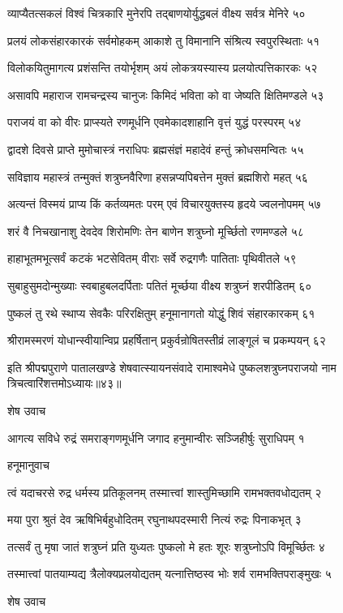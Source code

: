 व्याप्यैतत्सकलं विश्वं चित्रकारि मुनेरपि
तद्बाणयोर्युद्धबलं वीक्ष्य सर्वत्र मेनिरे ५०

प्रलयं लोकसंहारकारकं सर्वमोहकम्
आकाशे तु विमानानि संश्रित्य स्वपुरस्थिताः ५१

विलोकयितुमागत्य प्रशंसन्ति तयोर्भृशम्
अयं लोकत्रयस्यास्य प्रलयोत्पत्तिकारकः ५२

असावपि महाराज रामचन्द्रस्य चानुजः
किमिदं भविता को वा जेष्यति क्षितिमण्डले ५३

पराजयं वा को वीरः प्राप्स्यते रणमूर्धनि
एवमेकादशाहानि वृत्तं युद्धं परस्परम् ५४

द्वादशे दिवसे प्राप्ते मुमोचास्त्रं नराधिपः
ब्रह्मसंज्ञं महादेवं हन्तुं क्रोधसमन्वितः ५५

सविज्ञाय महास्त्रं तन्मुक्तं शत्रुघ्नवैरिणा
हसन्नप्यपिबत्तेन मुक्तं ब्रह्मशिरो महत् ५६

अत्यन्तं विस्मयं प्राप्य किं कर्तव्यमतः परम्
एवं विचारयुक्तस्य हृदये ज्वलनोपमम् ५७

शरं वै निचखानाशु देवदेव शिरोमणिः
तेन बाणेन शत्रुघ्नो मूर्च्छितो रणमण्डले ५८

हाहाभूतमभूत्सर्वं कटकं भटसेवितम्
वीराः सर्वे रुद्रगणैः पातिताः पृथिवीतले ५९

सुबाहुसुमदोन्मुख्याः स्वबाहुबलदर्पिताः
पतितं मूर्च्छया वीक्ष्य शत्रुघ्नं शरपीडितम् ६०

पुष्कलं तु रथे स्थाप्य सेवकैः परिरक्षितुम्
हनूमानागतो योद्धुं शिवं संहारकारकम् ६१

श्रीरामस्मरणं योधान्स्वीयान्विप्र प्रहर्षितान्
प्रकुर्वन्रोषितस्तीव्रं लाङ्गूलं च प्रकम्पयन् ६२

इति श्रीपद्मपुराणे पातालखण्डे शेषवात्स्यायनसंवादे रामाश्वमेधे पुष्कलशत्रुघ्नपराजयो नाम त्रिचत्वारिंशत्तमोऽध्यायः॥४३॥


शेष उवाच

आगत्य सविधे रुद्रं समराङ्गणमूर्धनि
जगाद हनुमान्वीरः सञ्जिहीर्षुः सुराधिपम् १

हनूमानुवाच

त्वं यदाचरसे रुद्र धर्मस्य प्रतिकूलनम्
तस्मात्त्वां शास्तुमिच्छामि रामभक्तवधोद्यतम् २

मया पुरा श्रुतं देव ऋषिभिर्बहुधोदितम्
रघुनाथपदस्मारी नित्यं रुद्रः पिनाकभृत् ३

तत्सर्वं तु मृषा जातं शत्रुघ्नं प्रति युध्यतः
पुष्कलो मे हतः शूरः शत्रुघ्नोऽपि विमूर्च्छितः ४

तस्मात्त्वां पातयाम्यद्य त्रैलोक्यप्रलयोद्यतम्
यत्नात्तिष्ठस्व भोः शर्व रामभक्तिपराङ्मुखः ५

शेष उवाच


